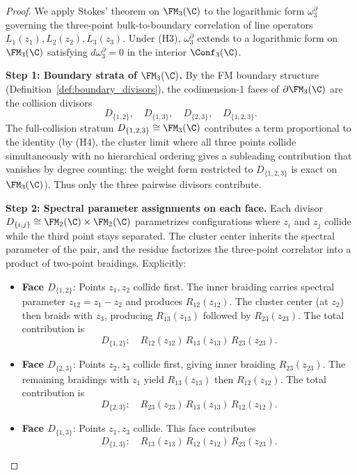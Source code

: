 \begin{proof}
We apply Stokes' theorem on $\FM_3(\C)$ to the logarithmic form $\omega_3^{\partial}$ governing the three-point bulk-to-boundary correlation of line operators $L_1(z_1), L_2(z_2), L_3(z_3)$. Under (H3), $\omega_3^{\partial}$ extends to a logarithmic form on $\FM_3(\C)$ satisfying $d\omega_3^{\partial} = 0$ in the interior $\Conf_3(\C)$.

\medskip
\noindent\textbf{Step 1: Boundary strata of $\FM_3(\C)$.}
By the FM boundary structure (Definition~\ref{def:boundary_divisors}), the codimension-1 faces of $\partial\FM_3(\C)$ are the collision divisors
\[
D_{\{1,2\}},\quad D_{\{1,3\}},\quad D_{\{2,3\}},\quad D_{\{1,2,3\}}.
\]
The full-collision stratum $D_{\{1,2,3\}} \cong \FM_3(\C)$ contributes a term proportional to the identity (by (H4), the cluster limit where all three points collide simultaneously with no hierarchical ordering gives a subleading contribution that vanishes by degree counting: the weight form restricted to $D_{\{1,2,3\}}$ is exact on $\FM_3(\C)$). Thus only the three pairwise divisors contribute.

\medskip
\noindent\textbf{Step 2: Spectral parameter assignments on each face.}
Each divisor $D_{\{i,j\}} \cong \FM_2(\C) \times \FM_2(\C)$ parametrizes configurations where $z_i$ and $z_j$ collide while the third point stays separated. The cluster center inherits the spectral parameter of the pair, and the residue factorizes the three-point correlator into a product of two-point braidings. Explicitly:

\begin{itemize}
\item \textbf{Face $D_{\{1,2\}}$}: Points $z_1, z_2$ collide first. The inner braiding carries spectral parameter $z_{12} = z_1 - z_2$ and produces $R_{12}(z_{12})$. The cluster center (at $z_2$) then braids with $z_3$, producing $R_{13}(z_{13})$ followed by $R_{23}(z_{23})$. The total contribution is
\[
D_{\{1,2\}}: \quad R_{12}(z_{12})\, R_{13}(z_{13})\, R_{23}(z_{23}).
\]

\item \textbf{Face $D_{\{2,3\}}$}: Points $z_2, z_3$ collide first, giving inner braiding $R_{23}(z_{23})$. The remaining braidings with $z_1$ yield $R_{13}(z_{13})$ then $R_{12}(z_{12})$. The total contribution is
\[
D_{\{2,3\}}: \quad R_{23}(z_{23})\, R_{13}(z_{13})\, R_{12}(z_{12}).
\]

\item \textbf{Face $D_{\{1,3\}}$}: Points $z_1, z_3$ collide. This face contributes
\[
D_{\{1,3\}}: \quad R_{13}(z_{13})\, R_{12}(z_{12})\, R_{23}(z_{23}).
\]
\end{itemize}


\end{proof}
